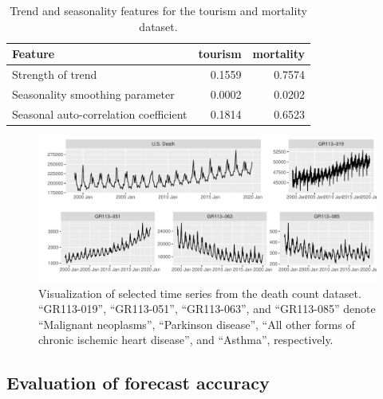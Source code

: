 \documentclass[a4paper,review,12pt,authoryear]{elsarticle}
\begin{document}
\begin{table}[h!]
    \centering
    \caption{\label{tab:features}Trend and seasonality features for the tourism  and mortality dataset.}
    \begin{tabular}{lrr}\toprule
        Feature & tourism &  mortality\\ \midrule
        Strength of trend & 0.1559 & 0.7574 \\
        Seasonality smoothing parameter & 0.0002 & 0.0202 \\ 
        Seasonal auto-correlation coefficient &0.1814  &0.6523  \\ 
 \bottomrule
    \end{tabular}
\end{table}


\begin{figure}[h!]
    \centering
    \vspace{0.2in}
    \includegraphics[width=\textwidth]{../manuscript/figures/mortality.pdf}
    \caption{{Visualization of selected time series from the death count dataset.} ``GR113-019'', ``GR113-051'',  ``GR113-063'', and ``GR113-085'' denote ``Malignant neoplasms'', ``Parkinson disease'', ``All other forms of chronic ischemic heart disease'', and ``Asthma'', respectively.}
    \label{fig:mortality}
\end{figure}

\subsection{Evaluation of forecast accuracy}
\label{subsec:evaluation}
\end{document}
